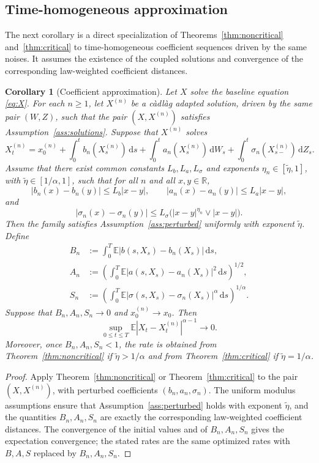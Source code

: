 \documentclass[11pt]{article}
\newtheorem{corollary}[theorem]{Corollary}
\newcommand{\R}{\mathbb{R}}
\newcommand{\E}{\mathbb{E}}
\newcommand{\1}{\mathbf{1}}
\newcommand{\dd}{\,\mathrm{d}}
\newcommand{\wt}{\tilde}
\begin{document}
\subsection{Time-homogeneous approximation}
\label{sec:approximation}

The next corollary is a direct specialization of Theorems~\ref{thm:noncritical} and~\ref{thm:critical} to time-homogeneous coefficient sequences driven by the same noises. It assumes the existence of the coupled solutions and convergence of the corresponding law-weighted coefficient distances.


\begin{corollary}[Coefficient approximation]
\label{cor:approx}
Let $X$ solve the baseline equation \eqref{eq:X}. For each $n\ge1$, let $X^{(n)}$ be a c\`adl\`ag adapted solution, driven by the same pair $(W,Z)$, such that the pair $(X,X^{(n)})$ satisfies Assumption~\ref{ass:solutions}. Suppose that $X^{(n)}$ solves
\[
X_t^{(n)}=x_0^{(n)}+\int_0^t b_n(X_s^{(n)})\dd s
+\int_0^t a_n(X_s^{(n)})\dd W_s
+\int_0^t \sigma_n(X_{s-}^{(n)})\dd Z_s.
\]
Assume that there exist common constants $L_b,L_a,L_\sigma$ and exponents $\eta_n\in[\wt\eta,1]$, with $\wt\eta\in[1/\alpha,1]$, such that for all $n$ and all $x,y\in\R$,
\[
|b_n(x)-b_n(y)|\le L_b|x-y|,
\qquad
|a_n(x)-a_n(y)|\le L_a|x-y|,
\]
and
\[
|\sigma_n(x)-\sigma_n(y)|\le L_\sigma\bigl(|x-y|^{\eta_n}\vee |x-y|\bigr).
\]
Then the family satisfies Assumption~\ref{ass:perturbed} uniformly with exponent $\wt\eta$. Define
\begin{align*}
B_n&:=\int_0^T\E |b(s,X_s)-b_n(X_s)|\dd s,\\
A_n&:=\left(\int_0^T\E |a(s,X_s)-a_n(X_s)|^2\dd s\right)^{1/2},\\
S_n&:=\left(\int_0^T\E |\sigma(s,X_s)-\sigma_n(X_s)|^\alpha\dd s\right)^{1/\alpha}.
\end{align*}
Suppose that $B_n,A_n,S_n\to0$ and $x_0^{(n)}\to x_0$. Then
\[
\sup_{0\le t\le T}\E|X_t-X_t^{(n)}|^{\alpha-1}\to0.
\]
Moreover, once $B_n,A_n,S_n<1$, the rate is obtained from Theorem~\ref{thm:noncritical} if $\wt\eta>1/\alpha$ and from Theorem~\ref{thm:critical} if $\wt\eta=1/\alpha$.
\end{corollary}

\begin{proof}
Apply Theorem~\ref{thm:noncritical} or Theorem~\ref{thm:critical} to the pair $(X,X^{(n)})$, with perturbed coefficients $(b_n,a_n,\sigma_n)$. The uniform modulus assumptions ensure that Assumption~\ref{ass:perturbed} holds with exponent $\wt\eta$, and the quantities $B_n,A_n,S_n$ are exactly the corresponding law-weighted coefficient distances. The convergence of the initial values and of $B_n,A_n,S_n$ gives the expectation convergence; the stated rates are the same optimized rates with $B,A,S$ replaced by $B_n,A_n,S_n$.
\end{proof}
\end{document}
